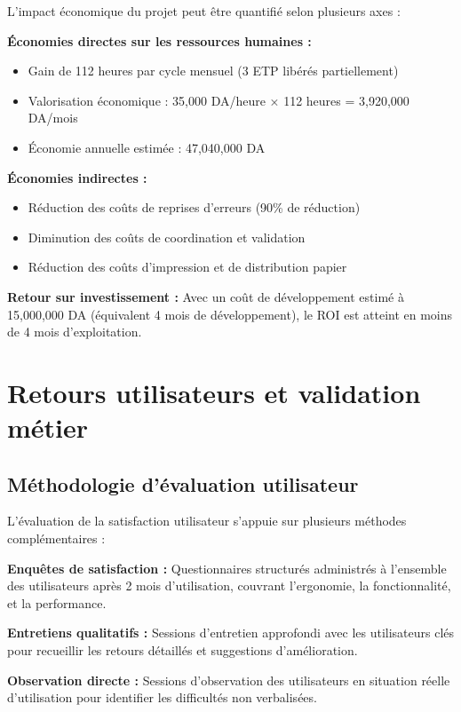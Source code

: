L'impact économique du projet peut être quantifié selon plusieurs axes :

\medskip

\textbf{Économies directes sur les ressources humaines :}
\begin{itemize}
    \item Gain de 112 heures par cycle mensuel (3 ETP libérés partiellement)
    \item Valorisation économique : 35,000 DA/heure × 112 heures = 3,920,000 DA/mois
    \item Économie annuelle estimée : 47,040,000 DA
\end{itemize}

\textbf{Économies indirectes :}
\begin{itemize}
    \item Réduction des coûts de reprises d'erreurs (90\% de réduction)
    \item Diminution des coûts de coordination et validation
    \item Réduction des coûts d'impression et de distribution papier
\end{itemize}

\textbf{Retour sur investissement :}
Avec un coût de développement estimé à 15,000,000 DA (équivalent 4 mois de développement), le ROI est atteint en moins de 4 mois d'exploitation.

\section{Retours utilisateurs et validation métier}

\subsection{Méthodologie d'évaluation utilisateur}

L'évaluation de la satisfaction utilisateur s'appuie sur plusieurs méthodes complémentaires :

\medskip

\textbf{Enquêtes de satisfaction :} Questionnaires structurés administrés à l'ensemble des utilisateurs après 2 mois d'utilisation, couvrant l'ergonomie, la fonctionnalité, et la performance.

\textbf{Entretiens qualitatifs :} Sessions d'entretien approfondi avec les utilisateurs clés pour recueillir les retours détaillés et suggestions d'amélioration.

\textbf{Observation directe :} Sessions d'observation des utilisateurs en situation réelle d'utilisation pour identifier les difficultés non verbalisées.

